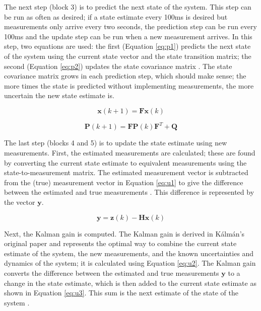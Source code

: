 \documentclass[12pt,a4paper]{report}
\begin{document}
\pagebreak

The next step (block 3) is to predict the next state of the system. This step can be run as often as desired; if a state estimate every 100ms is desired but measurements only arrive every two seconds, the prediction step can be run every 100ms and the update step can be run when a new measurement arrives. In this step, two equations are used: the first (Equation \ref{eq:p1}) predicts the next state of the system using the current state vector and the state transition matrix; the second (Equation \ref{eq:p2}) updates the state covariance matrix \cite{kfsimply}. The state covariance matrix grows in each prediction step, which should make sense; the more times the state is predicted without implementing measurements, the more uncertain the new state estimate is.

\begin{equation} \label{eq:p1}
	\mathbf{x}(k+1) = \mathbf{F} \mathbf{x}(k)
\end{equation}

\begin{equation} \label{eq:p2}
	\mathbf{P}(k+1) = \mathbf{F} \mathbf{P}(k) \mathbf{F}^T + \mathbf{Q}
\end{equation}

The last step (blocks 4 and 5) is to update the state estimate using new measurements. First, the estimated measurements are calculated; these are found by converting the current state estimate to equivalent measurements using the state-to-measurement matrix. The estimated measurement vector is subtracted from the (true) measurement vector in Equation \ref{eq:u1} to give the difference between the estimated and true measurements \cite{kfsimply}. This difference is represented by the vector \(\mathbf{y}\).

\begin{equation} \label{eq:u1}
	\mathbf{y} = \mathbf{z}(k) - \mathbf{H} \mathbf{x}(k)
\end{equation}

Next, the Kalman gain is computed. The Kalman gain is derived in Kálmán’s original paper \cite{kalman} and represents the optimal way to combine the current state estimate of the system, the new measurements, and the known uncertainties and dynamics of the system; it is calculated using Equation \ref{eq:u2}. The Kalman gain converts the difference between the estimated and true measurements \(\mathbf{y}\) to a change in the state estimate, which is then added to the current state estimate as shown in Equation \ref{eq:u3}. This sum is the next estimate of the state of the system \cite{kfsimply}.
\end{document}

